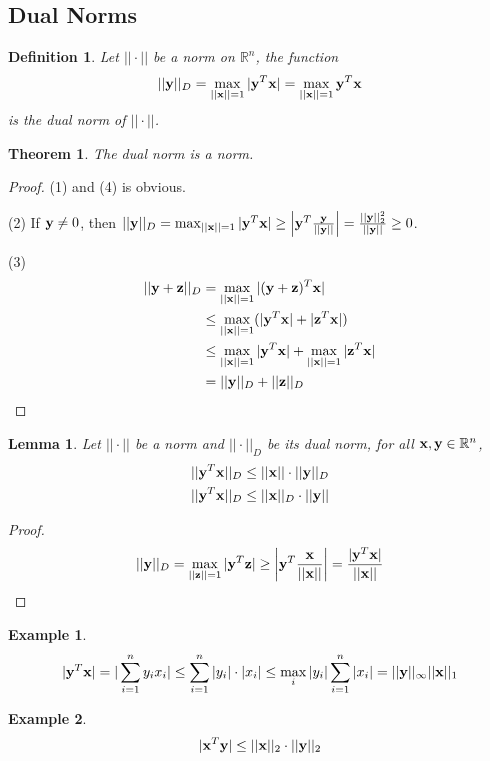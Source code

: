 \documentclass[11pt]{article}
\def\x{{\bf x}}
\def\y{{\bf y}}
\def\z{{\bf z}}
\def\BR{{\mathbb R}}
\newtheorem{theorem}{Theorem}[section]
\newtheorem{lemma}{Lemma}[section]
\newtheorem{definition}{Definition}[section]
\newtheorem{example}{Example}[section]
\begin{document}
\subsection{Dual Norms}
\begin{definition}
	Let $||\cdot||$ be a norm on $\BR^n$, the function 
	$$||\y||_D =\max_{||\x||=1}|\y^T\x|=\max_{||\x||=1}\y^T\x$$
	is the dual norm of $||\cdot||$.
\end{definition}
\begin{theorem}
	The dual norm is a norm.
\end{theorem}
\begin{proof}
	(1) and (4) is obvious. 
	
	(2) If $\y\ne0$, then $||\y||_D=\max_{||\x||=1}|\y^T\x|\ge \left|\y^T\frac{\y}{||\y||}\right|=\frac{||\y||_2^2}{||\y||}\ge 0$. 
	
	(3) \[
	\begin{aligned}
	||\y+\z||_D&=\max_{||\x||=1}|(\y+\z)^T\x| \\
	&\le \max_{||\x||=1}(|\y^T\x|+|\z^T\x|) \\
	&\le  \max_{||\x||=1}|\y^T\x|+\max_{||\x||=1}|\z^T\x| \\
	&=||\y||_D+||\z||_D 
	\end{aligned}
	\]
\end{proof}
	
\begin{lemma}
	Let $||\cdot||$ be a norm and $||\cdot||_D$ be its dual norm, for all $\x,\y\in \BR^n$,
	\[
	\begin{aligned}
	||\y^T\x||_D&\le  ||\x||\cdot||\y||_D \\
||\y^T\x||_D &\le  ||\x||_D\cdot||\y||
	\end{aligned}
	\]
	
\end{lemma}
\begin{proof}
	$$||\y||_D=\max_{||\z||=1}|\y^T\z|\ge \left|\y^T\frac{\x}{||\x||}\right| =\frac{|\y^T\x|}{||\x||}$$
\end{proof}	

\begin{example}
	$$|\y^T\x|=|\sum_{i=1}^ny_ix_i|\le \sum_{i=1}^n|y_i|\cdot|x_i| \le \max_i|y_i|\sum_{i=1}^n|x_i|=||\y||_\infty||\x||_1$$
\end{example}
\begin{example}
	$$|\x^T\y|\le ||\x||_2\cdot||\y||_2$$
\end{example}
\end{document}
